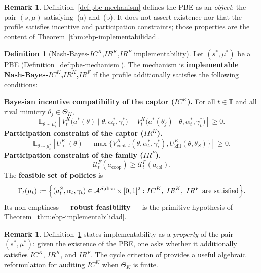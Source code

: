 \documentclass[12pt]{article}
\numberwithin{equation}{section}
\numberwithin{table}{section}
\theoremstyle{definition}
\newtheorem{definition}[theorem]{Definition}
\newtheorem{remark}[theorem]{Remark}
\begin{document}
\begin{remark}
Definition~\ref{def:pbe-mechanism} defines the PBE as an \emph{object}: the
pair $(s,\mu)$ satisfying~(a) and~(b). It does not assert existence nor that the
profile satisfies incentive and participation constraints; those properties are
the content of Theorem~\ref{thm:ebp-implementabilidad}.
\end{remark}

\bigskip

\begin{definition}[Nash-Bayes-$IC^K$,$IR^K$,$IR^F$ implementability]
\label{def:implementable-mechanism}
Let $(s^\ast,\mu^\ast)$ be a PBE (Definition~\ref{def:pbe-mechanism}). The
mechanism is \textbf{implementable Nash-Bayes-$IC^K$,$IR^K$,$IR^F$} if the
profile additionally satisfies the following conditions:

\smallskip
\noindent\textbf{Bayesian incentive compatibility of the captor ($IC^K$).}
For all $t\in\mathbb{T}$ and all rival mimicry $\theta_j\in\Theta_K$,
\[
\mathbb{E}_{\theta\sim\mu_t^\ast}
\!\left[
V^K_t\!\bigl(a^\ast(\theta)\mid\theta,\alpha_t^\ast,\gamma_t^\ast\bigr)
-V^K_t\!\bigl(a^\ast(\theta_j)\mid\theta,\alpha_t^\ast,\gamma_t^\ast\bigr)
\right]\ge 0.
\]
\noindent\textbf{Participation constraint of the captor ($IR^K$).}
\[
\mathbb{E}_{\theta\sim\mu_t^\ast}
\!\left[U^K_{\mathrm{rel}}(\theta)
-\max\bigl\{V^K_{\mathrm{cont},t}(\theta,\alpha_t^\ast,\gamma_t^\ast),
U^K_{\mathrm{kill}}(\theta,\theta_S)\bigr\}\right]\ge 0.
\]
\noindent\textbf{Participation constraint of the family ($IR^F$).}
\[
\mathcal{U}^F_t(a_{\mathrm{coop}})\ge\mathcal{U}^F_t(a_{\mathrm{col}}).
\]
The \textbf{feasible set of policies} is
\begin{equation}
\label{eq:gamma-factible}
\Gamma_t(\mu_t)
:=\Bigl\{(a_t^S,\alpha_t,\gamma_t)\in
\mathcal{A}^{S,\mathrm{disc}}\times[0,1]^2:
IC^K,\;IR^K,\;IR^F\text{ are satisfied}\Bigr\}.
\end{equation}
Its non-emptiness --- \textbf{robust feasibility} --- is the primitive
hypothesis of Theorem~\ref{thm:ebp-implementabilidad}.
\end{definition}

\begin{remark}
Definition~\ref{def:implementable-mechanism} states implementability as a
\emph{property} of the pair $(s^\ast,\mu^\ast)$: given the existence of the
PBE, one asks whether it additionally satisfies $IC^K$, $IR^K$, and $IR^F$. The
cycle criterion of \citet{Rochet1987} provides a useful algebraic
reformulation for auditing $IC^K$ when $\Theta_K$ is finite.
\end{remark}
\end{document}
